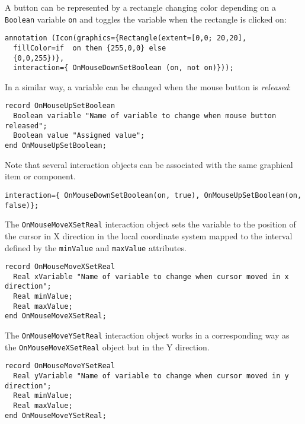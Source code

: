 \begin{example}
A button can be represented by a rectangle changing color depending on a \lstinline!Boolean! variable \lstinline!on! and toggles the
variable when the rectangle is clicked on:
\begin{lstlisting}[language=modelica]
  annotation (Icon(graphics={Rectangle(extent=[0,0; 20,20],
  fillColor=if  on then {255,0,0} else
  {0,0,255})},
  interaction={ OnMouseDownSetBoolean (on, not on)}));
\end{lstlisting}
\end{example}

In a similar way, a variable can be changed when the mouse button is
\emph{released}:
\begin{lstlisting}[language=modelica]
record OnMouseUpSetBoolean
  Boolean variable "Name of variable to change when mouse button released";
  Boolean value "Assigned value";
end OnMouseUpSetBoolean;
\end{lstlisting}
Note that several interaction objects can be associated with the same
graphical item or component.

\begin{example}
\begin{lstlisting}[language=modelica]
interaction={ OnMouseDownSetBoolean(on, true), OnMouseUpSetBoolean(on, false)};
\end{lstlisting}
\end{example}

The \lstinline!OnMouseMoveXSetReal! interaction object sets the variable to the
position of the cursor in X direction in the local coordinate system
mapped to the interval defined by the \lstinline!minValue! and \lstinline!maxValue! attributes.

\begin{lstlisting}[language=modelica]
record OnMouseMoveXSetReal
  Real xVariable "Name of variable to change when cursor moved in x direction";
  Real minValue;
  Real maxValue;
end OnMouseMoveXSetReal;
\end{lstlisting}
The \lstinline!OnMouseMoveYSetReal! interaction object works in a corresponding way
as the \lstinline!OnMouseMoveXSetReal! object but in the Y direction.

\begin{lstlisting}[language=modelica]
record OnMouseMoveYSetReal
  Real yVariable "Name of variable to change when cursor moved in y direction";
  Real minValue;
  Real maxValue;
end OnMouseMoveYSetReal;
\end{lstlisting}
